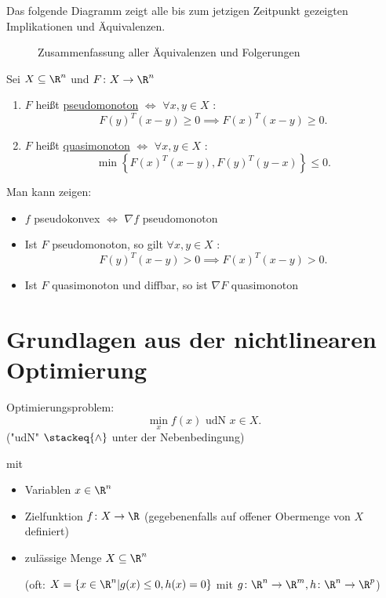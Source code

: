 \begin{folgerung}
	Das folgende Diagramm zeigt alle bis zum jetzigen Zeitpunkt gezeigten Implikationen und Äquivalenzen.

\label{thm:monotonefunktionenkonvexefunktionenfolgerung}
\begin{figure}[H]
	\begin{center}
		
	\end{center}
	\caption{Zusammenfassung aller Äquivalenzen und Folgerungen}
	\label{fig:ZusammenfassungKonvexUndMonoton}
\end{figure}

\end{folgerung}

\begin{definition}
\label{thm:pseudoquasimonoton}
	Sei $X \subseteq \R^{n}$ und $F \colon X \rightarrow \R^{n} $
	\begin{enumerate}[label=(\alph{enumi})]
		\item  $F$ heißt \underline{pseudomonoton} $\iff$ $\forall x,y \in X$ : 
			\[
				F(y)^{T}(x-y) \geq 0 \implies F(x)^{T}(x-y) \geq 0
			.\] 
		\item $F$ heißt \underline{quasimonoton} $\iff$ $\forall x,y \in X$ :
			\[
				\min \left\{ F(x)^{T}(x-y), F(y)^{T}(y-x) \right\} \leq 0
			.\] 
	\end{enumerate}

	Man kann zeigen:
	\begin{itemize}
		\item $f$ pseudokonvex $\iff$ $\nabla f$ pseudomonoton
		\item Ist $F$ pseudomonoton, so gilt $\forall x,y \in X$ :
			\[
				F(y)^{T} (x-y) > 0 \implies F(x)^{T} (x-y) > 0
			.\] 
		\item Ist $F$ quasimonoton und diffbar, so ist $\nabla F$ quasimonoton
	\end{itemize}
\end{definition}

\section{Grundlagen aus der nichtlinearen Optimierung}%
\label{sec:Grundlagen aus der nichtlinearen Optimierung}

Optimierungsproblem: 
\[
 \min\limits_{x} f(x) \text{ udN } x \in X
.\]
("udN" $\stackeq{\wedge}$ unter der Nebenbedingung)

mit
\begin{itemize}
	\item Variablen $x \in \R^{n}$
	\item Zielfunktion $f \colon X \rightarrow \R $ (gegebenenfalls auf offener Obermenge von $X$ definiert)
	\item zulässige Menge $X \subseteq \R^{n}$ 

		(oft: $X = \left\{ x \in \R^{n} | g(x) \leq 0, h(x) = 0 \right\} $ mit $g \colon \R^{n} \rightarrow \R^{m}, h \colon \R^{n} \rightarrow \R^{p}$)
\end{itemize}

